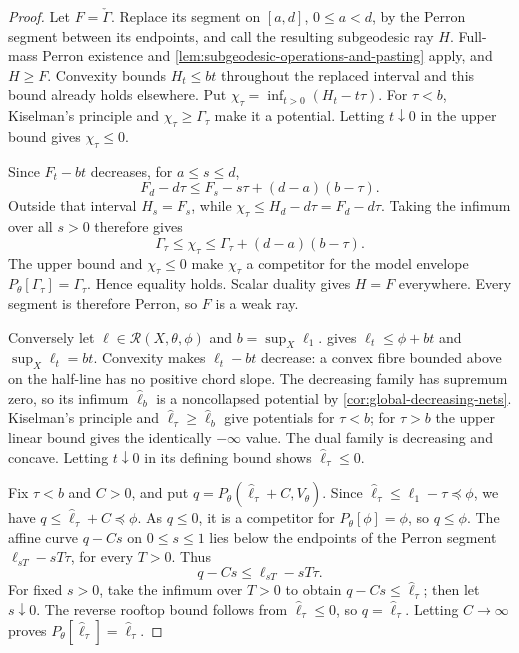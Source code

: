 \begin{proof}
\enlargethispage{3\baselineskip}
Let $F=\check\Gamma$. Replace its segment on $[a,d]$, $0\leq a<d$, by the Perron segment between its endpoints, and call the resulting subgeodesic ray $H$. Full-mass Perron existence and \cref{lem:subgeodesic-operations-and-pasting} apply, and $H\geq F$. Convexity bounds $H_t\leq bt$ throughout the replaced interval and this bound already holds elsewhere. Put $\chi_\tau=\inf_{t>0}(H_t-t\tau)$. For $\tau<b$, Kiselman's principle and $\chi_\tau\geq\Gamma_\tau$ make it a potential. Letting $t\downarrow0$ in the upper bound gives $\chi_\tau\leq0$.

Since $F_t-bt$ decreases, for $a\leq s\leq d$,
\[
 F_d-d\tau\leq F_s-s\tau+(d-a)(b-\tau).
\]
Outside that interval $H_s=F_s$, while $\chi_\tau\leq H_d-d\tau=F_d-d\tau$. Taking the infimum over all $s>0$ therefore gives
\[
 \Gamma_\tau\leq\chi_\tau
                  \leq\Gamma_\tau+(d-a)(b-\tau).
\]
The upper bound and $\chi_\tau\leq0$ make $\chi_\tau$ a competitor for the model envelope $P_\theta[\Gamma_\tau]=\Gamma_\tau$. Hence equality holds. Scalar duality gives $H=F$ everywhere. Every segment is therefore Perron, so $F$ is a weak ray.

Conversely let $\ell\in\mathcal R(X,\theta,\phi)$ and $b=\sup_X\ell_1$.  gives $\ell_t\leq\phi+bt$ and $\sup_X\ell_t=bt$. Convexity makes $\ell_t-bt$ decrease: a convex fibre bounded above on the half-line has no positive chord slope. The decreasing family has supremum zero, so its infimum $\widehat\ell_b$ is a noncollapsed potential by \cref{cor:global-decreasing-nets}. Kiselman's principle and $\widehat\ell_\tau\geq\widehat\ell_b$ give potentials for $\tau<b$; for $\tau>b$ the upper linear bound gives the identically $-\infty$ value. The dual family is decreasing and concave. Letting $t\downarrow0$ in its defining bound shows $\widehat\ell_\tau\leq0$.

Fix $\tau<b$ and $C>0$, and put
$q=P_\theta(\widehat\ell_\tau+C,V_\theta)$.
Since $\widehat\ell_\tau\leq\ell_1-\tau\preceq\phi$, we have $q\leq\widehat\ell_\tau+C\preceq\phi$. As $q\leq0$, it is a competitor for $P_\theta[\phi]=\phi$, so $q\leq\phi$. The affine curve $q-Cs$ on $0\leq s\leq1$ lies below the endpoints of the Perron segment $\ell_{sT}-sT\tau$, for every $T>0$. Thus
\[
 q-Cs\leq\ell_{sT}-sT\tau.
\]
For fixed $s>0$, take the infimum over $T>0$ to obtain $q-Cs\leq\widehat\ell_\tau$; then let $s\downarrow0$. The reverse rooftop bound follows from $\widehat\ell_\tau\leq0$, so $q=\widehat\ell_\tau$. Letting $C\to\infty$ proves $P_\theta[\widehat\ell_\tau]=\widehat\ell_\tau$.


\end{proof}
